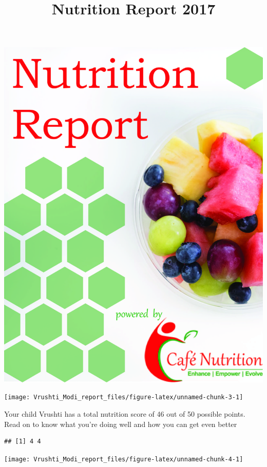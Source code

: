 \documentclass[]{article}
\title{Nutrition Report 2017}
\author{}
\date{}
\begin{document}
\maketitle

\includegraphics{../Files/title_page.jpg}

\newpage

\begin{center}\texttt{[image: Vrushti\_Modi\_report\_files/figure-latex/unnamed-chunk-3-1]} \end{center}

Your child Vrushti has a total nutrition score of 46 out of 50 possible
points. Read on to know what you're doing well and how you can get even
better

\begin{verbatim}
## [1] 4 4
\end{verbatim}

\begin{center}\texttt{[image: Vrushti\_Modi\_report\_files/figure-latex/unnamed-chunk-4-1]} \end{center}
\end{document}
